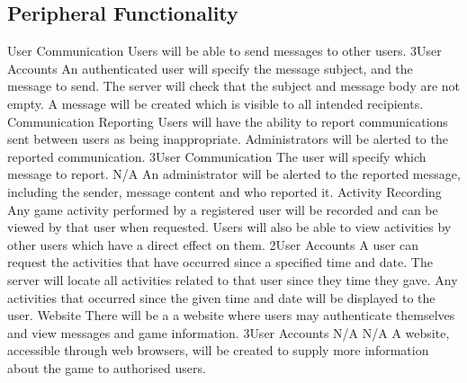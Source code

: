 	\subsection{Peripheral Functionality}
		\funcreq
			{User Communication}
			{Users will be able to send messages to other users.}
			{3}{User Accounts}
			{An authenticated user will specify the message subject, and the message to send.}
			{The server will check that the subject and message body are not empty.}
			{A message will be created which is visible to all intended recipients.}
		\funcreq
			{Communication Reporting}
			{Users will have the ability to report communications sent between users as being inappropriate. Administrators will be alerted to the reported communication.}
			{3}{User Communication}
			{The user will specify which message to report.}
			{N/A}
			{An administrator will be alerted to the reported message, including the sender, message content and who reported it.}
		\funcreq
			{Activity Recording}
			{Any game activity performed by a registered user will be recorded and can be viewed by that user when requested. Users will also be able to view activities by other users which have a direct effect on them.}
			{2}{User Accounts}
			{A user can request the activities that have occurred since a specified time and date.}
			{The server will locate all activities related to that user since they time they gave.}
			{Any activities that occurred since the given time and date will be displayed to the user.}
		\funcreq
			{Website}
			{There will be a a website where users may authenticate themselves and view messages and game information.}
			{3}{User Accounts}
			{N/A}
			{N/A}
			{A website, accessible through web browsers, will be created to supply more information about the game to authorised users.}
\renewcommand{\arraystretch}{1}
